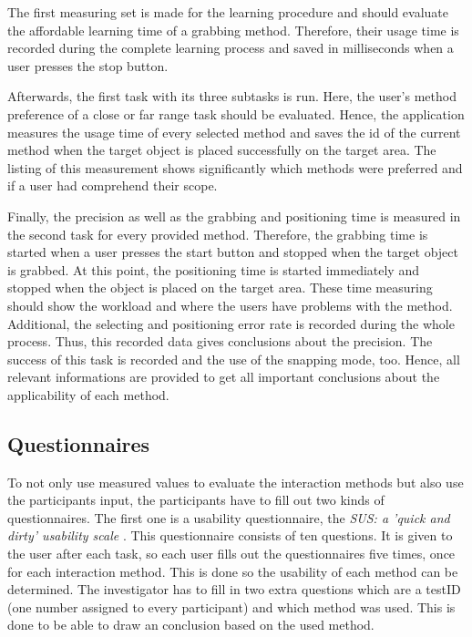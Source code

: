 The first measuring set is made for the learning procedure and should evaluate the affordable learning time of a grabbing method. Therefore, their usage time is recorded during the complete learning process and saved in milliseconds when a user presses the stop button. 

Afterwards, the first task with its three subtasks is run. Here, the user's method preference of a close or far range task should be evaluated. Hence, the application measures the usage time of every selected method and saves the id of the current method when the target object is placed successfully on the target area. The listing of this measurement shows significantly which methods were preferred and if a user had comprehend their scope.  

Finally, the precision as well as the grabbing and positioning time is measured in the second task for every provided method. Therefore, the grabbing time is started when a user presses the start button and stopped when the target object is grabbed. At this point, the positioning time is started immediately and stopped when the object is placed on the target area. These time measuring should show the workload and where the users have problems with the method. Additional, the selecting and positioning error rate is recorded during the whole process. Thus, this recorded data gives conclusions about the precision. The success of this task is recorded and the use of the snapping mode, too. Hence, all relevant informations are provided to get all important conclusions about the applicability of each method. 

\subsection{Questionnaires} \label{sec:questionnaires}

To not only use measured values to evaluate the interaction methods but also use the participants input, the participants have to fill out two kinds of questionnaires. The first one is a usability questionnaire, the \textit{SUS: a 'quick and dirty' usability scale} \citep{sus}. This questionnaire consists of ten questions. It is given to the user after each task, so each user fills out the questionnaires five times, once for each interaction method. This is done so the usability of each method can be determined. The investigator has to fill in two extra questions which are a testID (one number assigned to every participant) and which method was used. This is done to be able to draw an conclusion based on the used method. \\

